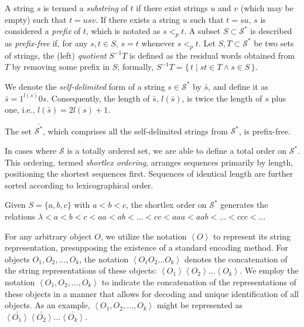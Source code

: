 A string $s$ is termed a \emph{substring} of $t$ if there exist strings $u$ and $v$ (which may be empty) such that $t = usv$. If there exists a string $u$ such that $t = su$, $s$ is considered a \emph{prefix} of $t$, which is notated as $s <_p t$. A subset $S \subset \mathcal{S}^{\ast}$ is described as \emph{prefix-free} if, for any $s, t \in S$, $s = t$ whenever $s <_p t$. Let $S, T \subset \mathcal{S}^{\ast}$ be two sets of strings, the (left) \emph{quotient} $S^{-1}T$ is defined as the residual words obtained from $T$ by removing some prefix in $S$; formally, $S^{-1}T=\{\,t \mid st \in T \land s \in S\,\}$.

We denote the \emph{self-delimited} form of a string $s \in \mathcal{S}^{\ast}$ by $\bar{s}$, and define it as $\bar{s} = 1^{l(s)}0s$. Consequently, the length of $\bar{s}$, $l(\bar{s})$, is twice the length of $s$ plus one, i.e., $l(\bar{s}) = 2l(s)+1$.

\begin{example}
The set $\bar{\mathcal{S}^{\ast}}$, which comprises all the self-delimited strings from $\mathcal{S}^{\ast}$, is prefix-free.
\end{example}

In cases where $\mathcal{S}$ is a totally ordered set, we are able to define a total order on $\mathcal{S}^{\ast}$. This ordering, termed \emph{shortlex ordering}, arranges sequences primarily by length, positioning the shortest sequences first. Sequences of identical length are further sorted according to lexicographical order.

\begin{example}
Given $S = \{a, b, c\}$ with $a < b < c$, the shortlex order on $\mathcal{S}^{\ast}$ generates the relations $\lambda < a < b < c < aa < ab < \ldots < cc < aaa < aab < \ldots < ccc < \ldots$
\end{example}

For any arbitrary object $O$, we utilize the notation $\left\langle O\right\rangle$ to represent its string representation, presupposing the existence of a standard encoding method. For objects $O_{1},O_{2},\ldots,O_{k}$, the notation $\left\langle O_1 O_2 \ldots O_k \right\rangle$ denotes the concatenation of the string representations of these objects: $\left\langle O_1 \right\rangle \left\langle O_2 \right\rangle \ldots \left\langle O_k \right\rangle$. We employ the notation $\left\langle O_1, O_2,\ldots,O_k \right\rangle$ to indicate the concatenation of the representations of these objects in a manner that allows for decoding and unique identification of all objects. As an example, $\left\langle O_1, O_2,\ldots,O_k \right\rangle$ might be represented as $\bar{\left\langle O_1 \right\rangle} \bar{\left\langle O_2 \right\rangle} \ldots \bar{\left\langle O_k \right\rangle}$.

